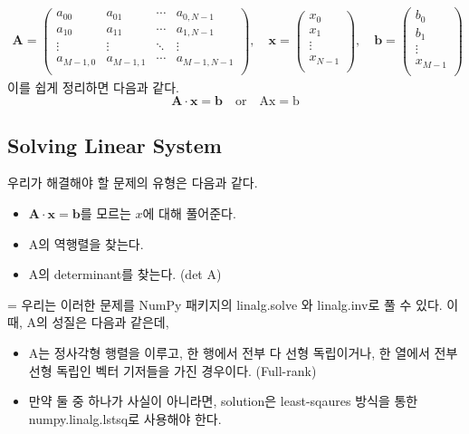 \documentclass[11pt]{article}
\begin{document}
\begin{equation}
\begin{split}
\mathbf A = \left(
\begin{matrix}
a_{00} & a_{01} & \cdots & a_{0,N-1} \\
a_{10} & a_{11} & \cdots & a_{1,N-1} \\
\vdots & \vdots & \ddots & \vdots    \\
a_{M-1,0} & a_{M-1,1} & \cdots & a_{M-1,N-1} \\
\end{matrix}
\right)
,\quad
\mathbf x = \left(
\begin{matrix}
x_0 \\ x_1 \\ \vdots \\ x_{N - 1} \\
\end{matrix}
\right)
,\quad
\mathbf b = \left(
\begin{matrix}
b_0 \\ b_1 \\ \vdots \\ x_{M - 1} \\
\end{matrix}
\right)
\end{split}
\end{equation}
이를 쉽게 정리하면 다음과 같다.
\begin{equation}
\mathbf A \cdot \mathbf x = \mathbf b
\quad\text{or}\quad
\mathrm{Ax} = \mathrm b
\end{equation}

\subsection{Solving Linear System} 
우리가 해결해야 할 문제의 유형은 다음과 같다.
\begin{itemize}
    \item $\mathbf A \cdot \mathbf x = \mathbf b $를 모르는 $x$에 대해 풀어준다.
    \item A의 역행렬을 찾는다.
    \item A의 determinant를 찾는다. (det A)
\end{itemize}=
우리는 이러한 문제를 NumPy 패키지의 linalg.solve 와 linalg.inv로 풀 수 있다. 이때, A의 성질은 다음과 같은데,
\begin{itemize}
    \item A는 정사각형 행렬을 이루고, 한 행에서 전부 다 선형 독립이거나, 한 열에서 전부 선형 독립인 벡터 기저들을 가진 경우이다. (Full-rank)
    \item 만약 둘 중 하나가 사실이 아니라면, solution은 least-sqaures 방식을 통한 numpy.linalg.lstsq로 사용해야 한다. 
\end{itemize}
\end{document}
